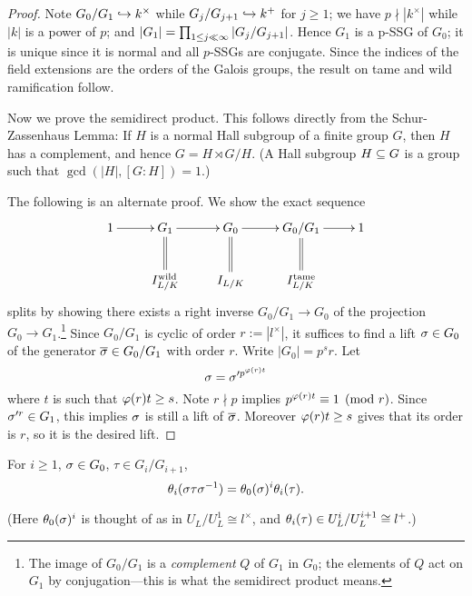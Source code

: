 \begin{proof}
Note $G_0/G_1\hookrightarrow k^{\times}$ while $G_j/G_{j+1}\hookrightarrow k^+$ for $j\ge 1$; we have $p\nmid |k^{\times}|$ while $|k|$ is a power of $p$; and $|G_1|=\prod_{1\le j\ll \infty} |G_j/G_{j+1}|$. Hence $G_1$ is a p-SSG of $G_0$; it is unique since it is normal and all $p$-SSGs are conjugate. Since the indices of the field extensions are the orders of the Galois groups, the result on tame and wild ramification follow.

Now we prove the semidirect product.
This follows directly from the Schur-Zassenhaus Lemma: If $H$ is a normal Hall subgroup of a finite group $G$, then $H$ has a complement, and hence $G=H\rtimes G/H$. (A Hall subgroup $H\subseteq G$ is a group such that $\gcd(|H|,[G:H])=1$.)

The following is an alternate proof. We show the exact sequence
\[
\xymatrix{
1\ar[r] & G_1\ar[r]\ar@{=}[d]& G_0\ar[r]\ar@{=}[d]& G_0/G_1\ar[r]\ar@{=}[d]& 1\\
& I_{L/K}^{\text{wild}} & I_{L/K} & I_{L/K}^{\text{tame}}
}
\]
splits by showing there exists a right inverse $G_0/G_1\to G_0$ of the projection $G_0\to G_1$.\footnote{The image of $G_0/G_1$ is a {\it complement} $Q$ of $G_1$ in $G_0$; the elements of $Q$ act on $G_1$ by conjugation---this is what the semidirect product means.}
Since $G_0/G_1$ is cyclic of order $r:=|l^{\times}|$, it suffices to find a lift $\sigma\in G_0$ of the generator $\overline{\sigma}\in G_0/G_1$ with order $r$. Write $|G_0|=p^sr$. Let
\[
\sigma=\sigma'^{p^{\varphi(r)t}}
\]
where $t$ is such that $\varphi(r)t\ge s$. Note $r\nmid p$ implies $p^{\varphi(r)t}\equiv 1\pmod{r}$. Since $\sigma'^r\in G_1$, this implies $\sigma$ is still a lift of $\overline{\sigma}$. Moreover $\varphi(r)t\ge s$ gives that its order is $r$, so it is the desired lift.
\end{proof}
\begin{pr}
For $i\ge 1$, $\sigma\in G_0$, $\tau\in G_i/G_{i+1}$,
\[
\theta_i(\sigma\tau\sigma^{-1})=\theta_{0}(\sigma)^i\theta_i(\tau).
\]
\end{pr}
(Here $\theta_0(\sigma)^i$ is thought of as in $U_L/U_L^1\cong l^{\times}$, and $\theta_i(\tau)\in U_L^i/U_L^{i+1}\cong l^+$.)
